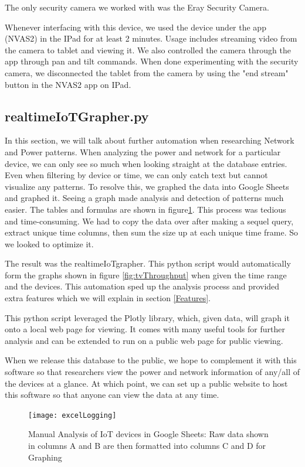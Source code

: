 The only security camera we worked with was the Eray Security Camera.

Whenever interfacing with this device, we used the device under the app (NVAS2) in the IPad for at least 2 minutes. Usage includes streaming video from the camera to tablet and viewing it. We also controlled the camera through the app through pan and tilt commands. When done experimenting with the security camera, we disconnected the tablet from the camera by using the "end stream" button in the NVAS2 app on IPad.

\subsection{realtimeIoTGrapher.py}
\label{realtimeIoTGrapher.py}

In this section, we will talk about further automation when researching Network and Power patterns. When analyzing the power and network for a particular device, we can only see so much when looking straight at the database entries. Even when filtering by device or time, we can only catch text but cannot visualize any patterns. To resolve this, we graphed the data into Google Sheets and graphed it. Seeing a graph made analysis and detection of patterns much easier. The tables and formulas are shown in figure\ref{fig:excelLogging}. This process was tedious and time-consuming. We had to copy the data over after making a sequel query, extract unique time columns, then sum the size up at each unique time frame. So we looked to optimize it.

The result was the realtimeIoTgrapher. This python script would automatically form the graphs shown in figure \ref{fig:tvThroughput} when given the time range and the devices. This automation sped up the analysis process and provided extra features which we will explain in section \ref{Features}.

This python script leveraged the Plotly library, which, given data, will graph it onto a local web page for viewing. It comes with many useful tools for further analysis and can be extended to run on a public web page for public viewing.

When we release this database to the public, we hope to complement it with this software so that researchers view the power and network information of any/all of the devices at a glance. At which point, we can set up a public website to host this software so that anyone can view the data at any time.

\begin{figure}[H]
    \centering
    \texttt{[image: excelLogging]}
    \caption{Manual Analysis of IoT devices in Google Sheets: Raw data shown in columns A and B are then formatted into columns C and D for Graphing}
    \label{fig:excelLogging}
\end{figure}


